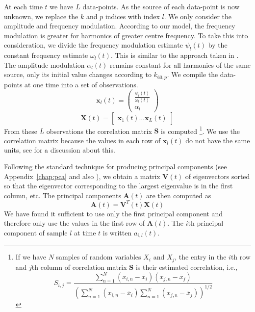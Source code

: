 At each time $t$ we have $L$ data-points. As the source of each data-point is
now unknown, we replace the $k$ and $p$ indices with index $l$. We only consider
the amplitude and frequency modulation. According to our model, the frequency
modulation is greater for harmonics of greater centre frequency. To take this
into consideration, we divide the frequency modulation estimate $\psi_{l}(t)$ by
the constant frequency estimate $\omega_{l}(t)$. This is similar to the approach
taken in \cite{creager2016musicalsource}. The amplitude modulation $\alpha_{l}(t)$
remains constant for all harmonics of the same source, only its initial value
changes according to $k_{60,p}$.  We compile the data-points at one time into a
set of observations.
\begin{equation}
    \mathbf{x}_{l}(t) = \begin{pmatrix}
        \frac{\psi_{l}(t)}{\omega_{l}(t)} \\
        \alpha_{l}
    \end{pmatrix}
\end{equation}
\begin{equation}
    \mathbf{X}(t) = \begin{bmatrix}
        \mathbf{x}_{1}(t) \ldots \mathbf{x}_{L}(t)
    \end{bmatrix}
\end{equation}
From these $L$ observations the correlation matrix $\mathbf{S}$ is
computed%
\footnote{If we have $N$ samples of random variables $X_{i}$ and $X_{j}$, the
    entry in the $i$th row and $j$th column of correlation matrix $\boldsymbol{S}$ is their
    estimated correlation, i.e.,
    \[
        S_{i,j}=\frac{\sum_{n=1}^{N}(x_{i,n}-\overline{x}_{i})(x_{j,n}-\overline{x}_{j})}
        {(\sum_{n=1}^{N}(x_{i,n}-\overline{x}_{i})\sum_{n=1}^{N}(x_{j,n}-\overline{x}_{j}))^{1/2}}
    \]
}. We
use the correlation matrix because the values in each row of $\mathbf{x}_{l}(t)$
do not have the same units, see \cite[p.~22]{jolliffe2002principal} for a
discussion about this. 

Following the standard technique for producing principal components (see
Appendix~\ref{chap:pca} and also \cite[p.~11]{jolliffe2002principal}), we obtain
a matrix $\mathbf{V}(t)$ of eigenvectors sorted so that the eigenvector
corresponding to the largest eigenvalue is in the first column, etc.  The
principal components $\mathbf{A}(t)$ are then computed as
\begin{equation}
    \mathbf{A}(t) = \mathbf{V}^{T}(t)\mathbf{X}(t)
\end{equation}
We have found it sufficient to use only the first principal component and
therefore only use the values in the first row of $\mathbf{A}(t)$. The $i$th
principal component of sample $l$ at time $t$ is written $a_{i,l}(t)$.


